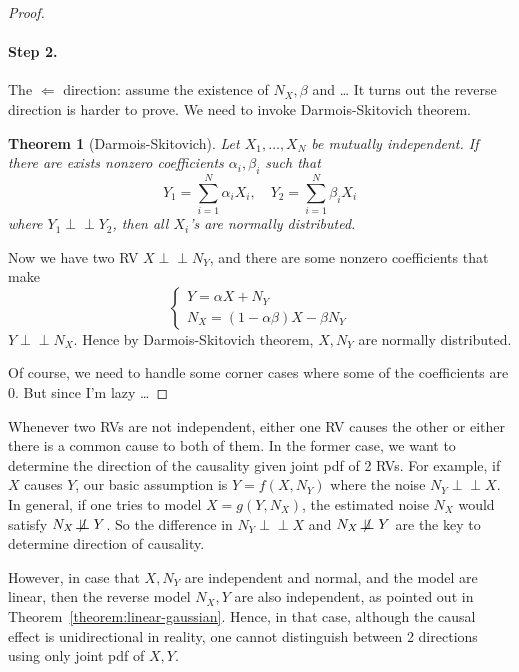 \documentclass[11pt,a4paper]{article}
\newcommand{\indep}{\perp \!\!\! \perp}
\newcommand{\notindep}{\not\!\perp \!\!\! \perp}
\theoremstyle{plain}
\newtheorem{theorem}{Theorem}[section]
\theoremstyle{definition}
\theoremstyle{remark}
\begin{document}
\begin{proof}
\paragraph{Step 2.}  The $\Leftarrow$ direction: assume the existence of  $N_X, \beta$ and \ldots 
It turns out the reverse direction is harder to prove. We need to invoke Darmois-Skitovich theorem.
\begin{theorem}[Darmois-Skitovich]
    Let $X_1, \ldots , X_N$ be mutually independent. If there are exists nonzero coefficients $\alpha_i, \beta_i$ such that
    \[
    Y_1 = \sum^{N}_{i=1} \alpha_i X_i, \quad Y_2 = \sum^{N}_{i=1} \beta_i X_i
    \] 
    where $Y_1 \indep Y_2$, then all  $X_i$'s  are normally distributed.
\end{theorem}
Now we have two RV $X \indep N_Y$, and there are some nonzero coefficients that make
\[
\begin{cases}
Y = \alpha X + N_Y \\
N_X = (1-\alpha \beta) X - \beta N_Y
\end{cases}
\] 
$Y \indep N_X$. Hence by Darmois-Skitovich theorem,  $X, N_Y$ are normally distributed.

Of course, we need to handle some corner cases where some of the coefficients are $0$. But since I'm lazy \ldots  
\end{proof}

Whenever two RVs are not independent, either one RV causes the other or either there is a common cause to both of them. In the former case, we want to determine the direction of the causality given joint pdf of 2 RVs.
 For example, if $X$ causes  $Y$, our basic assumption is  $Y = f(X, N_Y)$ where the noise $N_Y \indep X$.
In general, if one tries to model  $X = g(Y, N_X)$, the estimated noise $N_X$ would satisfy $N_X \notindep Y$. So the difference in $N_Y \indep X$ and  $N_X \notindep Y$ are the key to determine direction of causality.

However, in case that $X, N_Y$ are independent and normal, and the model are linear, then the reverse  model $N_X, Y$ are also independent, as pointed out in Theorem~\ref{theorem:linear-gaussian}. Hence, in that case, although the causal effect is unidirectional in reality, one cannot distinguish between 2 directions using only joint pdf of $X, Y$.
\printbibliography
\end{document}
